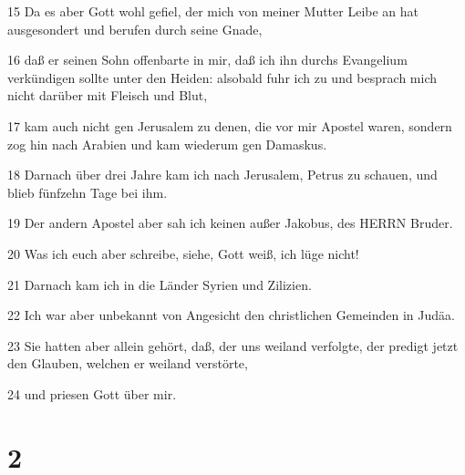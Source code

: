\par 15 Da es aber Gott wohl gefiel, der mich von meiner Mutter Leibe an hat ausgesondert und berufen durch seine Gnade,
\par 16 daß er seinen Sohn offenbarte in mir, daß ich ihn durchs Evangelium verkündigen sollte unter den Heiden: alsobald fuhr ich zu und besprach mich nicht darüber mit Fleisch und Blut,
\par 17 kam auch nicht gen Jerusalem zu denen, die vor mir Apostel waren, sondern zog hin nach Arabien und kam wiederum gen Damaskus.
\par 18 Darnach über drei Jahre kam ich nach Jerusalem, Petrus zu schauen, und blieb fünfzehn Tage bei ihm.
\par 19 Der andern Apostel aber sah ich keinen außer Jakobus, des HERRN Bruder.
\par 20 Was ich euch aber schreibe, siehe, Gott weiß, ich lüge nicht!
\par 21 Darnach kam ich in die Länder Syrien und Zilizien.
\par 22 Ich war aber unbekannt von Angesicht den christlichen Gemeinden in Judäa.
\par 23 Sie hatten aber allein gehört, daß, der uns weiland verfolgte, der predigt jetzt den Glauben, welchen er weiland verstörte,
\par 24 und priesen Gott über mir.

\chapter{2}

